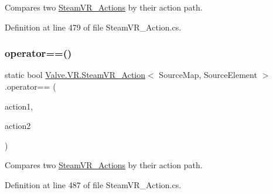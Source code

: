 Compares two \mbox{\hyperlink{class_valve_1_1_v_r_1_1_steam_v_r___actions}{Steam\+V\+R\+\_\+\+Actions}} by their action path. 



Definition at line 479 of file Steam\+V\+R\+\_\+\+Action.\+cs.

\mbox{\label{class_valve_1_1_v_r_1_1_steam_v_r___action_a58a25d1d89f51b0ddcc65ebf6c1e8e54}} 
\subsubsection{\texorpdfstring{operator==()}{operator==()}}
{\footnotesize\ttfamily static bool \mbox{\hyperlink{class_valve_1_1_v_r_1_1_steam_v_r___action}{Valve.\+V\+R.\+Steam\+V\+R\+\_\+\+Action}}$<$ Source\+Map, Source\+Element $>$.operator== (\begin{DoxyParamCaption}\item[{\mbox{\hyperlink{class_valve_1_1_v_r_1_1_steam_v_r___action}{Steam\+V\+R\+\_\+\+Action}}$<$ Source\+Map, Source\+Element $>$}]{action1,  }\item[{\mbox{\hyperlink{class_valve_1_1_v_r_1_1_steam_v_r___action}{Steam\+V\+R\+\_\+\+Action}}$<$ Source\+Map, Source\+Element $>$}]{action2 }\end{DoxyParamCaption})\hspace{0.3cm}{\ttfamily [static]}}



Compares two \mbox{\hyperlink{class_valve_1_1_v_r_1_1_steam_v_r___actions}{Steam\+V\+R\+\_\+\+Actions}} by their action path. 



Definition at line 487 of file Steam\+V\+R\+\_\+\+Action.\+cs.

\mbox{\label{class_valve_1_1_v_r_1_1_steam_v_r___action_ae3ab26df1e48bd668134f71845cf727a}} 
